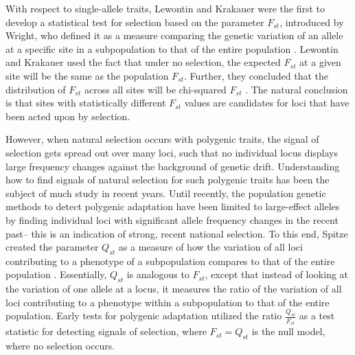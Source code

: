 \documentclass[a4paper,12pt]{article}
\begin{document}
With respect to single-allele traits, Lewontin and Krakauer were the
first to develop a statistical test for selection based on the
parameter $F_{st}$, introduced by Wright, who
defined it as a measure comparing
the genetic variation of an allele at a specific site in a subpopulation to that of the entire population
\cite{Fst}. Lewontin and Krakauer used the fact
that under no selection, the expected $F_{st}$ at a given site will be the same
as the population $F_{st}$. Further, they concluded that the
distribution of $F_{st}$ across all sites will be chi-squared
$F_{st}$ \cite{firstseltest}. The natural conclusion is that sites
with statistically different $F_{st}$ values are candidates for loci
that have been acted upon by selection.

However, when natural selection occurs with polygenic
traits, the signal of selection gets spread out over many loci, such
that no individual locus displays large frequency changes against the
background of genetic drift. Understanding
how to find signals of natural selection for such polygenic traits has been
the subject of much study in recent years. Until recently, the
population genetic methods to detect polygenic adaptation have been
limited to large-effect alleles by finding individual loci with significant
allele frequency changes in the recent past-- this is an indication of
strong, recent national selection. To this end, Spitze created the
parameter $Q_{st}$ as a measure of how the variation of all loci
contributing to a phenotype of a subpopulation compares to that of the entire
population \cite{Qst}. Essentially, $Q_{st}$ is analogous to $F_{st}$,
except that instead of looking at the variation of one allele at a
locus, it measures the ratio of the variation of all loci contributing to a
phenotype within a subpopulation to that of the entire
population. Early tests for polygenic adaptation utilized the ratio
$\frac{Q_{st}}{F_{st}}$ as a test statistic for detecting signals of
selection, where $F_{st} = Q_{st}$ is the null model, where no
selection occurs. 

\end{document}
